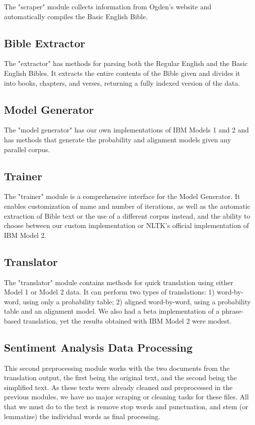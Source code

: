 \documentclass[11pt]{article}
\begin{document}
The "scraper" module collects information from Ogden's website and automatically compiles the Basic English Bible.

\subsection{Bible Extractor}

The "extractor" has methods for parsing both the Regular English and the Basic English Bibles. It extracts the entire contents of the Bible given and divides it into books, chapters, and verses, returning a fully indexed version of the data.

\subsection{Model Generator}

The "model generator" has our own implementations of IBM Models 1 and 2 and has methods that generate the probability and alignment models given any parallel corpus.

\subsection{Trainer}

The "trainer" module is a comprehensive interface for the Model Generator. It enables customization of name and number of iterations, as well as the automatic extraction of Bible text or the use of a different corpus instead, and the ability to choose between our custom implementation or NLTK's official implementation of IBM Model 2.

\subsection{Translator}

The "translator" module contains methods for quick translation using either Model 1 or Model 2 data. It can perform two types of translations: 1) word-by-word, using only a probability table; 2) aligned word-by-word, using a probability table and an alignment model. We also had a beta implementation of a phrase-based translation, yet the results obtained with IBM Model 2 were modest.

\subsection{Sentiment Analysis Data Processing}
This second preprocessing module works with the two documents from the translation output, the first being the original text, and the second being the simplified text. As these texts were already cleaned and preprocessed in the previous modules, we have no major scraping or cleaning tasks for these files. All that we must do to the text is remove stop words and punctuation, and stem (or lemmatize) the individual words as final processing.
\end{document}
